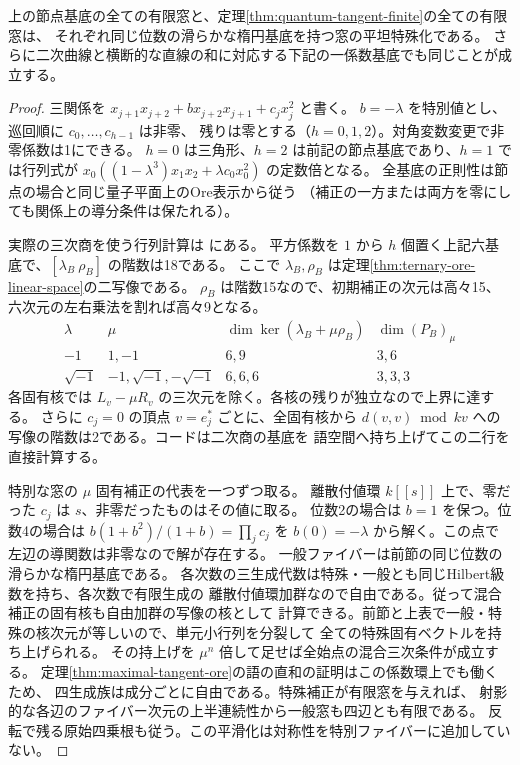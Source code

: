 \begin{theorem}\label{thm:ternary-torsion-smoothing}
上の節点基底の全ての有限窓と、定理\ref{thm:quantum-tangent-finite}の全ての有限窓は、
それぞれ同じ位数の滑らかな楕円基底を持つ窓の平坦特殊化である。
さらに二次曲線と横断的な直線の和に対応する下記の一係数基底でも同じことが成立する。
\end{theorem}
\begin{proof}
三関係を $x_{j+1}x_{j+2}+b x_{j+2}x_{j+1}+c_jx_j^2$ と書く。
$b=-\lambda$ を特別値とし、巡回順に $c_0,\ldots,c_{h-1}$ は非零、
残りは零とする（$h=0,1,2$）。対角変数変更で非零係数は1にできる。
$h=0$ は三角形、$h=2$ は前記の節点基底であり、$h=1$ では行列式が
$x_0((1-\lambda^3)x_1x_2+\lambda c_0x_0^2)$ の定数倍となる。
全基底の正則性は節点の場合と同じ量子平面上のOre表示から従う
（補正の一方または両方を零にしても関係上の導分条件は保たれる）。

実際の三次商を使う行列計算は
にある。
平方係数を $1$ から $h$ 個置く上記六基底で、$[\lambda_B\ \rho_B]$ の階数は18である。
ここで $\lambda_B,\rho_B$ は定理\ref{thm:ternary-ore-linear-space}の二写像である。
$\rho_B$ は階数15なので、初期補正の次元は高々15、六次元の左右乗法を割れば高々9となる。
\[
\begin{array}{c|c|c|c}
\lambda&\mu&\dim\ker(\lambda_B+\mu\rho_B)&
       \dim (P_B)_{\mu}\\ \hline
-1&1,-1&6,9&3,6\\
\sqrt{-1}&-1,\sqrt{-1},-\sqrt{-1}&6,6,6&3,3,3
\end{array}
\]
各固有核では $L_v-\mu R_v$ の三次元を除く。各核の残りが独立なので上界に達する。
さらに $c_j=0$ の頂点 $v=e_j^*$ ごとに、全固有核から
$d(v,v)\bmod kv$ への写像の階数は2である。コードは二次商の基底を
語空間へ持ち上げてこの二行を直接計算する。

特別な窓の $\mu$ 固有補正の代表を一つずつ取る。
離散付値環 $k[[s]]$ 上で、零だった $c_j$ は $s$、非零だったものはその値に取る。
位数2の場合は $b=1$ を保つ。位数4の場合は $b(1+b^2)/(1+b)=\prod_j c_j$
を $b(0)=-\lambda$ から解く。この点で左辺の導関数は非零なので解が存在する。
一般ファイバーは前節の同じ位数の滑らかな楕円基底である。
各次数の三生成代数は特殊・一般とも同じHilbert級数を持ち、各次数で有限生成の
離散付値環加群なので自由である。従って混合補正の固有核も自由加群の写像の核として
計算できる。前節と上表で一般・特殊の核次元が等しいので、単元小行列を分裂して
全ての特殊固有ベクトルを持ち上げられる。
その持上げを $\mu^n$ 倍して足せば全始点の混合三次条件が成立する。
定理\ref{thm:maximal-tangent-ore}の語の直和の証明はこの係数環上でも働くため、
四生成族は成分ごとに自由である。特殊補正が有限窓を与えれば、
射影的な各辺のファイバー次元の上半連続性から一般窓も四辺とも有限である。
反転で残る原始四乗根も従う。この平滑化は対称性を特別ファイバーに追加していない。
\end{proof}
